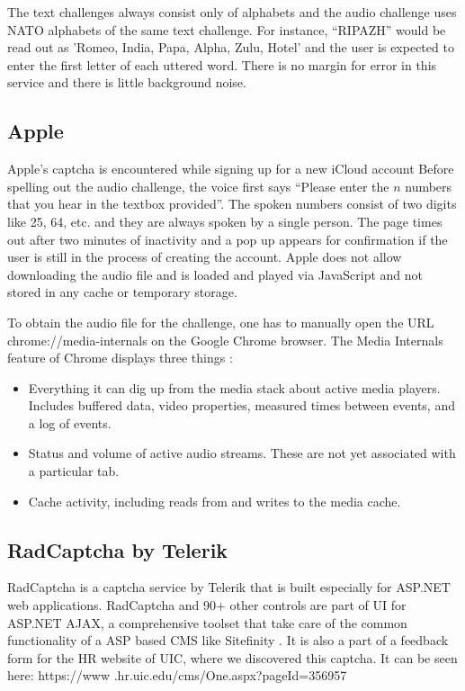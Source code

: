 The text challenges always consist only of alphabets and the audio challenge uses NATO alphabets 
of the same text challenge. For instance, ``RIPAZH'' would be read out as 'Romeo, India, Papa, Alpha, 
Zulu, Hotel' and the user is expected to enter the first letter of each uttered word. There is no 
margin for error in this service and there is little background noise.

\subsection{Apple}

Apple's captcha is encountered while signing up for a new iCloud account 
Before spelling out the audio challenge, 
the voice first says ``Please enter the $n$ numbers that you hear in the textbox provided''. The 
spoken numbers consist of two digits like 25, 64, etc. and they are always spoken by a single person. 
The page times out after two minutes of inactivity and a pop up appears for confirmation if the user is 
still in the process of creating the account. Apple does not allow downloading the audio file and is 
loaded and played via JavaScript and not stored in any cache or temporary storage.

To obtain the audio file for the challenge, one has to manually open the URL chrome://media-internals 
on the Google Chrome browser. The Media Internals feature of Chrome displays three things \cite{media}:
\begin{itemize}
\item Everything it can dig up from the media stack about active media players. Includes buffered data, 
    video properties, measured times between events, and a log of events.
\item Status and volume of active audio streams. These are not yet associated with a particular tab.
\item Cache activity, including reads from and writes to the media cache.\newline
\end{itemize}

\subsection{RadCaptcha by Telerik}

RadCaptcha is a captcha service by Telerik that is built especially for ASP.NET 
web applications. RadCaptcha and 90+ other controls are part of UI for ASP.NET AJAX, 
a comprehensive toolset that take care of the common functionality of a ASP based 
CMS like Sitefinity \cite{radcaptcha}. It is also a part of a feedback form for the 
HR website of UIC, where we discovered this captcha. It can be seen here: https://www
.hr.uic.edu/cms/One.aspx?pageId=356957\newline

